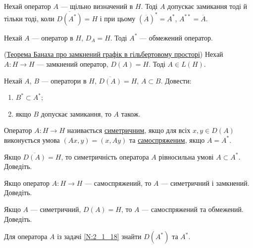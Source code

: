 \begin{exercise}
    Нехай оператор $A$ --- щільно визначений в $H$. Тоді $A$ допускає замикання тоді 
    й тільки тоді, коли $\overline{D(A^*)} = H$ і при цьому $(\overline{A})^* = A^*$, $A^{**} = \overline{A}$.
\end{exercise}

\begin{exercise}
    Нехай $A$ --- оператор в $H$, $D_A = H$. Тоді $A^*$ --- обмежений оператор.
\end{exercise}

\begin{exercise}(\ul{Теорема Банаха про замкнений графік в гільбертовому просторі})
    Нехай $A: H \to H$ --- замкнений оператор, $D(A) = H$. Тоді $A \in L(H)$.
\end{exercise}

\begin{exercise}
    Нехай $A$, $B$ --- оператори в $H$, $\overline{D(A)} = H$, $A \subset B$.
    Довести:
    \begin{enumerate}
        \item $B^* \subset A^*$;
        \item якщо $B$ допускає замикання, то $A$ також.
    \end{enumerate}
\end{exercise}

\begin{theory}
    Оператор $A: H \to H$ називається \ul{симетричним}, якщо для всіх $x,y \in D(A)$
    виконується умова $(Ax,y) = (x, Ay)$ та \ul{самоспряженим}, якщо $A = A^*$.
\end{theory}

\begin{exercise}
    Якщо $\overline{D(A)} = H$, то симетричність оператора $A$ рівносильна умові
    $A \subset A^*$. Доведіть.
\end{exercise}

\begin{exercise}
    Якщо оператор $A: H \to H$ --- самоспряжений, то $A$ --- симетричний і замкнений. Доведіть.
\end{exercise}

\begin{exercise}
    Якщо $A$ --- симетричний, $D(A) = H$, то $A$ --- самоспряжений та обмежений. Доведіть.
\end{exercise}

\begin{exercise}
    Для оператора $A$ із задачі \ref{N:2_1_18} знайти $D(A^*)$ та $A^*$.
\end{exercise}

